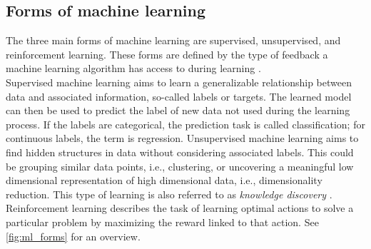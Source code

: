\subsection{Forms of machine learning}
\label{theory:ml:forms}
The three main forms of machine learning are supervised, unsupervised, and reinforcement learning. These forms are defined by the type of feedback a machine learning algorithm has access to during learning \cite{Shalev2014}.\\
Supervised machine learning aims to learn a generalizable relationship between data and associated information, so-called labels or targets. The learned model can then be used to predict the label of new data not used during the learning process. If the labels are categorical, the prediction task is called classification; for continuous labels, the term is regression. Unsupervised machine learning aims to find hidden structures in data without considering associated labels. This could be grouping similar data points, i.e., clustering, or uncovering a meaningful low dimensional representation of high dimensional data, i.e., dimensionality reduction. This type of learning is also referred to as \textit{knowledge discovery} \cite{Murphy2012}. Reinforcement learning describes the task of learning optimal actions to solve a particular problem by maximizing the reward linked to that action. See \autoref{fig:ml_forms} for an overview.\\
\\

